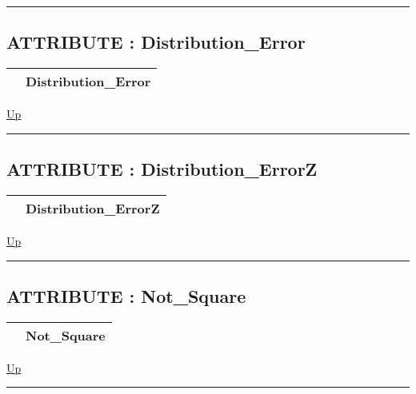\rule{\textwidth}{0.4pt}
\subsection*{ATTRIBUTE : Distribution\_Error}
\hypertarget{ecldoc:pbblas.constants.distribution_error}{}

{\renewcommand{\arraystretch}{1.5}
\begin{tabularx}{\textwidth}{|>{\raggedright\arraybackslash}l|X|}
\hline
\hspace{0pt} & Distribution\_Error \\
\hline
\end{tabularx}
}

\hyperlink{ecldoc:PBblas.Constants}{Up}

\par


\rule{\textwidth}{0.4pt}
\subsection*{ATTRIBUTE : Distribution\_ErrorZ}
\hypertarget{ecldoc:pbblas.constants.distribution_errorz}{}

{\renewcommand{\arraystretch}{1.5}
\begin{tabularx}{\textwidth}{|>{\raggedright\arraybackslash}l|X|}
\hline
\hspace{0pt} & Distribution\_ErrorZ \\
\hline
\end{tabularx}
}

\hyperlink{ecldoc:PBblas.Constants}{Up}

\par


\rule{\textwidth}{0.4pt}
\subsection*{ATTRIBUTE : Not\_Square}
\hypertarget{ecldoc:pbblas.constants.not_square}{}

{\renewcommand{\arraystretch}{1.5}
\begin{tabularx}{\textwidth}{|>{\raggedright\arraybackslash}l|X|}
\hline
\hspace{0pt} & Not\_Square \\
\hline
\end{tabularx}
}

\hyperlink{ecldoc:PBblas.Constants}{Up}

\par


\rule{\textwidth}{0.4pt}
